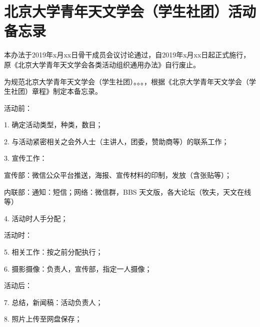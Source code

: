 \chapter{北京大学青年天文学会（学生社团）活动备忘录}

本办法于2019年x月xx日骨干成员会议讨论通过，自2019年x月xx日起正式施行，原《北京大学青年天文学会各类活动组织通用办法》自行废止。

为规范北京大学青年天文学会（学生社团）。。。，根据《北京大学青年天文学会（学生社团）章程》制定本备忘录。

活动前：

1. 确定活动类型，种类，数目；

2. 与活动紧密相关之会外人士（主讲人，团委，赞助商等）的联系工作；

3. 宣传工作：

宣传部：微信公众平台推送，海报、宣传材料的印制，发放（含张贴等）；

内联部：通知：短信；网络：微信群，BBS 天文版，各大论坛（牧夫，天文在线等）

4. 活动时人手分配；

活动时：

5. 相关工作：按之前分配执行；

6. 摄影摄像：负责人，宣传部，指定一人摄像；

活动后：

7. 总结，新闻稿：活动负责人；

8. 照片上传至网盘保存；
